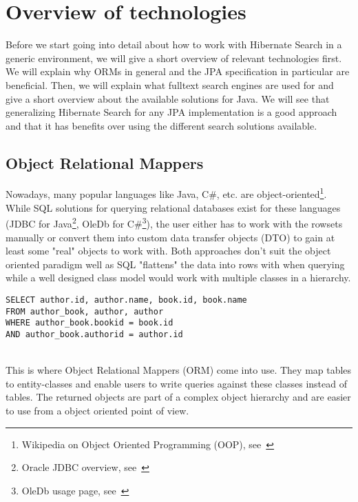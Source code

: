 \section{Overview of technologies}\label{Overview}
Before we start going into detail about how to work with Hibernate Search in a generic environment, we will give a short overview of relevant technologies first. We will explain why ORMs in general and the JPA specification in particular are beneficial. Then, we will explain what fulltext search engines are used for and give a short overview about the available solutions for Java. We will see that generalizing Hibernate Search for any JPA implementation is a good approach and that it has benefits over using the different search solutions available.

\subsection{Object Relational Mappers}
Nowadays, many popular languages like Java, C\#, etc. are object-oriented\footnote{Wikipedia on Object Oriented Programming (OOP), see~\cite{object_oriented_programming_wiki}}.
While SQL solutions for querying relational databases exist for these languages (JDBC for Java\footnote{Oracle JDBC overview, see~\cite{jdbc_oracle}}, OleDb for C\#\footnote{OleDb usage page, see~\cite{oledb_ms}}), the user either has to work with the rowsets manually or convert them into custom data transfer objects (DTO) to gain at least some "real" objects to work with. Both approaches don't suit the object oriented paradigm well as SQL "flattens" the data into rows with when querying while a well designed class model would work with multiple classes in a hierarchy.
\\
\lstset{language=sql}
\begin{lstlisting}[frame=htrbl, caption={sql query "flattening" the author and book table into rows}, label={lst:flattening.sql}]
SELECT author.id, author.name, book.id, book.name 
FROM author_book, author, author
WHERE author_book.bookid = book.id
AND author_book.authorid = author.id
\end{lstlisting}
~\\
This is where Object Relational Mappers (ORM) come into use. They map tables to entity-classes and
enable users to write queries against these classes instead of tables. The returned objects are part of a complex object hierarchy and are easier to use from a object oriented point of view.
\\
